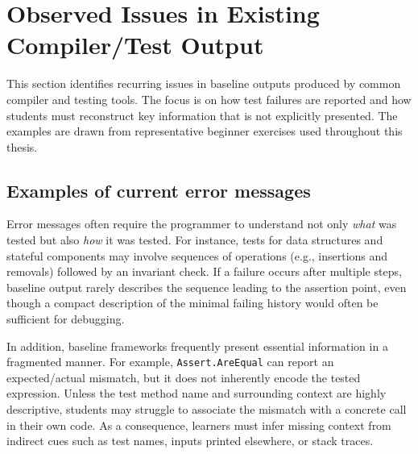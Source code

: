 \section{Observed Issues in Existing Compiler/Test Output} %
  \label{Observed Issues in Existing Compiler/Test Output} %


\improve


\begin{justify}
This section identifies recurring issues in baseline outputs produced by common compiler and testing
tools. The focus is on how test failures are reported and how students must reconstruct key
information that is not explicitly presented. The examples are drawn from representative beginner
exercises used throughout this thesis.
\end{justify}


\subsection{Examples of current error messages} %
     \label{Examples of current error messages} %


\begin{justify}
Error messages often require the programmer to understand not only \emph{what} was tested but also
\emph{how} it was tested. For instance, tests for data structures and stateful components may
involve sequences of operations (e.g., insertions and removals) followed by an invariant check.
If a failure occurs after multiple steps, baseline output rarely describes the sequence leading to
the assertion point, even though a compact description of the minimal failing history would often be
sufficient for debugging.

In addition, baseline frameworks frequently present essential information in a fragmented manner.
For example, \texttt{Assert.AreEqual} can report an expected/actual mismatch, but it does not
inherently encode the tested expression. Unless the test method name and surrounding context are
highly descriptive, students may struggle to associate the mismatch with a concrete call in their
own code. As a consequence, learners must infer missing context from indirect cues such as test
names, inputs printed elsewhere, or stack traces.
\end{justify}


